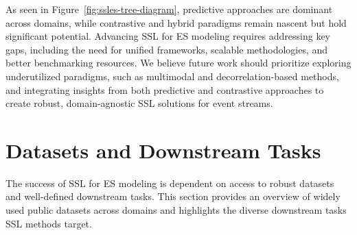 \documentclass[twoside,11pt]{article}
\begin{document}
As seen in Figure~\ref{fig:ssles-tree-diagram}, predictive approaches are dominant across domains, while contrastive and hybrid paradigms remain nascent but hold significant potential. Advancing SSL for ES modeling requires addressing key gaps, including the need for unified frameworks, scalable methodologies, and better benchmarking resources. We believe future work should prioritize exploring underutilized paradigms, such as multimodal and decorrelation-based methods, and integrating insights from both predictive and contrastive approaches to create robust, domain-agnostic SSL solutions for event streams.

\section{Datasets and Downstream Tasks}
\label{sec:es-data-overview}
The success of SSL for ES modeling is dependent on access to robust datasets and well-defined downstream tasks. This section provides an overview of widely used public datasets across domains and highlights the diverse downstream tasks SSL methods target.
\end{document}
